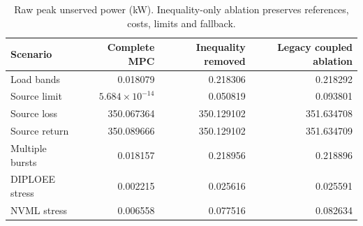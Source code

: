 \begin{table}[t]
\centering
\small
\caption{Raw peak unserved power (kW). Inequality-only ablation preserves references, costs, limits and fallback.}
\begin{tabular}{lrrr}
\hline
Scenario & Complete MPC & Inequality removed & Legacy coupled ablation \\
\hline
Load bands & 0.018079 & 0.218306 & 0.218292 \\
Source limit & $5.684\times10^{-14}$ & 0.050819 & 0.093801 \\
Source loss & 350.067364 & 350.129102 & 351.634708 \\
Source return & 350.089666 & 350.129102 & 351.634709 \\
Multiple bursts & 0.018157 & 0.218956 & 0.218896 \\
DIPLOEE stress & 0.002215 & 0.025616 & 0.025591 \\
NVML stress & 0.006558 & 0.077516 & 0.082634 \\
\hline
\end{tabular}
\end{table}
